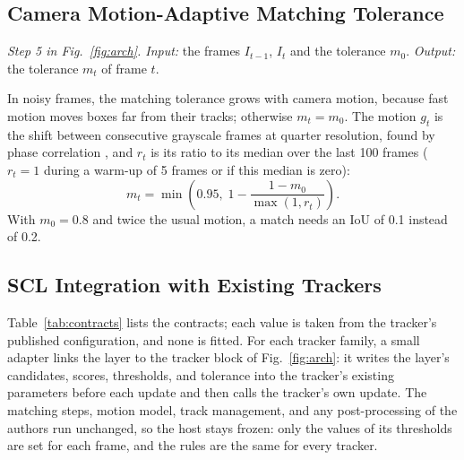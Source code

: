 \documentclass[pdflatex,sn-mathphys-num,iicol]{sn-jnl}
\begin{document}
\subsection{Camera Motion-Adaptive Matching Tolerance}\label{sec:motion}
\emph{Step 5 in Fig.~\ref{fig:arch}. Input:} the frames $I_{t-1}$, $I_t$ and the tolerance $m_0$. \emph{Output:} the tolerance
$m_t$ of frame $t$.

In noisy frames, the matching tolerance grows with camera motion, because fast motion moves boxes
far from their tracks; otherwise $m_t=m_0$. The motion $g_t$ is the shift between consecutive
grayscale frames at quarter resolution, found by phase correlation \cite{reddy1996phasecorr}, and
$r_t$ is its ratio to its median over the last 100 frames ($r_t=1$ during a warm-up of 5 frames or
if this median is zero):
\begin{equation}
m_t=\min\!\left(0.95,\;1-\frac{1-m_0}{\max(1,r_t)}\right).
\label{eq:motion}
\end{equation}
With $m_0=0.8$ and twice the usual motion, a match needs an IoU of 0.1 instead of 0.2.

\subsection{SCL Integration with Existing Trackers}\label{sec:contract}
Table~\ref{tab:contracts} lists the contracts; each value is taken from the tracker's published
configuration, and none is fitted. For each tracker family, a small adapter links the layer to the
tracker block of Fig.~\ref{fig:arch}: it writes the layer's candidates, scores, thresholds, and
tolerance into the tracker's existing parameters before each update and then calls the tracker's
own update. The matching steps, motion model, track management, and any post-processing of the
authors run unchanged, so the host stays frozen: only the values of its thresholds are set for
each frame, and the rules are the same for every tracker.
\end{document}
